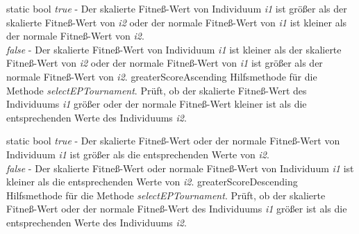 \documentclass{report}
\begin{document}
\setNormalInstance
\setCorrectWidthThree{8pt}
\printMethodWithParamsSaved
{static bool}
{
 {\em true} - Der skalierte Fitne{\ss}-Wert von Individuum {\em i1}
              ist gr\"o{\ss}er als der skalierte Fitne{\ss}-Wert
              von {\em i2} oder der normale Fitne{\ss}-Wert von {\em i1}
              ist kleiner als der normale Fitne{\ss}-Wert von {\em i2}.\\
 {\em false} - Der skalierte Fitne{\ss}-Wert von Individuum {\em i1}
               ist kleiner als der skalierte Fitne{\ss}-Wert
               von {\em i2} oder der normale Fitne{\ss}-Wert von {\em i1}
               ist gr\"o{\ss}er als der normale Fitne{\ss}-Wert von 
               {\em i2}.}
{greaterScoreAscending}
{Hilfsmethode f\"ur die Methode {\em selectEPTournament}.
 Pr\"uft, ob der skalierte Fitne{\ss}-Wert des Individuums {\em i1} 
 gr\"o{\ss}er oder der normale Fitne{\ss}-Wert kleiner ist als die 
 entsprechenden Werte des Individuums {\em i2}.}
{}
\setCorrectWidthThree{4pt}

\vspace{4ex}

\setNormalInstance
\setCorrectWidthThree{8pt}
\printMethodWithParamsSaved
{static bool}
{
 {\em true} - Der skalierte Fitne{\ss}-Wert oder der normale
              Fitne{\ss}-Wert von Individuum {\em i1} ist gr\"o{\ss}er 
              als die entsprechenden Werte von {\em i2}.\\
 {\em false} - Der skalierte Fitne{\ss}-Wert oder normale Fitne{\ss}-Wert
               von Individuum {\em i1} ist kleiner als die entsprechenden
               Werte von {\em i2}.}
{greaterScoreDescending}
{Hilfsmethode f\"ur die Methode {\em selectEPTournament}.
 Pr\"uft, ob der skalierte Fitne{\ss}-Wert oder der normale Fitne{\ss}-Wert 
 des Individuums {\em i1} gr\"o{\ss}er ist als die entsprechenden Werte des 
 Individuums {\em i2}.}
{}
\setCorrectWidthThree{4pt}

\newpage
\end{document}

